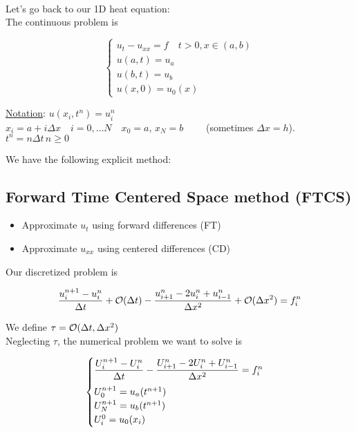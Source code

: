 \-\\

Let's go back to our 1D heat equation: \\

The continuous problem is 

\[
\begin{cases}
  u_t - u_{xx} = f \quad t>0, x\in(a,b)\\
  u(a,t) = u_a\\
  u(b,t) = u_b \\
  u(x,0) = u_0(x)
\end{cases}
\]

\underline{Notation}: $u(x_i,t^n) = u_i^n$ \\
$x_i = a + i\Delta x \quad i = 0,\ldots N \quad x_0 = a,\, x_N = b \qquad$ (sometimes $\Delta x = h$).\\
$t^n = n\Delta t \, n\geq0$\\

\newpage

We have the following explicit method:

\subsection{Forward Time Centered Space method (FTCS)}

\begin{itemize}
    \item Approximate $u_t$ using forward differences (FT)
    \item Approximate $u_{xx}$ using centered differences (CD)
\end{itemize}

Our discretized problem is

\[
  \frac{u_i^{n+1} - u_i^n}{\Delta t} + \mathcal{O}(\Delta t) - \frac{u_{i+1}^n - 2u_i^n + u_{i-1}^n}{\Delta x^2} + \mathcal{O}(\Delta x^2) = f_i^n
\]

We define $\tau = \mathcal{O}(\Delta t,\Delta x^2)$ \\

Neglecting $\tau$, the numerical problem we want to solve is

\[
  \begin{cases}
    \dfrac{U_i^{n+1} - U_i^n}{\Delta t} - \dfrac{U_{i+1}^n - 2U_i^n + U_{i-1}^n}{\Delta x^2} = f_i^n \vspace{0.2cm}\\
    U_0^{n+1} = u_a(t^{n+1})\\
    U_N^{n+1} = u_b(t^{n+1}) \\
    U_i^0 = u_0(x_i)
  \end{cases}
\]

